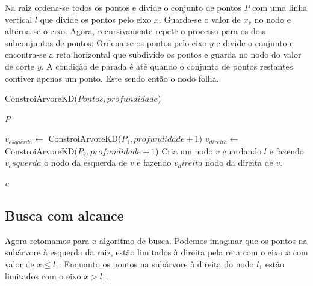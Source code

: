 Na raiz ordena-se todos os pontos e divide o conjunto de pontos \(P\) com uma linha vertical
\(l\) que divide os pontos pelo eixo \(x\). Guarda-se o valor de \(x_v\) no nodo e alterna-se o
eixo.
Agora, recursivamente repete o processo para os dois subconjuntos de pontos:
Ordena-se os pontos pelo eixo \(y\) e divide o conjunto e encontra-se a reta horizontal que
subdivide os pontos e guarda no nodo do valor de corte \(y\).
A condição de parada é até quando o conjunto de pontos restantes contiver apenas um ponto.
Este sendo então o nodo folha.


\begin{algorithm}
    \caption{ConstroiArvoreKD($Pontos, profundidade$)}
    \begin{algorithmic}
        \RETURN $P$
        \ELSE
        \ENDIF

        \STATE $v_{esquerda} \leftarrow $ ConstroiArvoreKD($P_1, profundidade+1$)
        \STATE $v_{direita} \leftarrow $ ConstroiArvoreKD($P_2, profundidade+1$)
        Cria um nodo $v$ guardando $l$ e fazendo $v_esquerda$ o nodo da esquerda
        de $v$ e fazendo $v_direita$ nodo da direita de $v$.

        \RETURN $v$
    \end{algorithmic}
\end{algorithm}

\subsection{Busca com alcance}

Agora retomamos para o algoritmo de busca. Podemos imaginar que os pontos na subárvore à esquerda
da raiz, estão limitados à direita pela reta com o eixo \(x\) com valor de \(x \leq l_1\).
Enquanto os pontos na subárvore à direita do nodo \(l_1\) estão limitados com o eixo \(x > l_1\).

